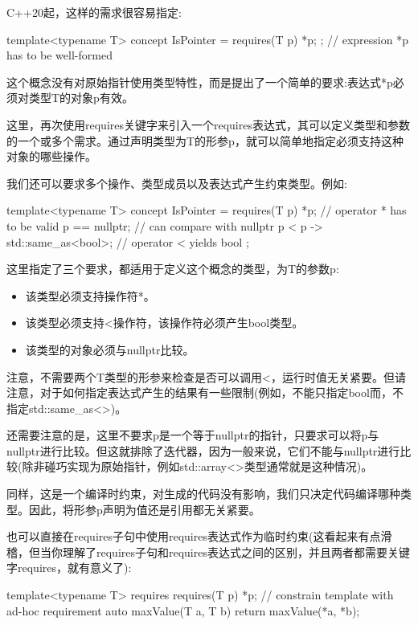 C++20起，这样的需求很容易指定:

\begin{cpp}
template<typename T>
concept IsPointer = requires(T p) { *p; }; // expression *p has to be well-formed
\end{cpp}

这个概念没有对原始指针使用类型特性，而是提出了一个简单的要求:表达式*p必须对类型T的对象p有效。

这里，再次使用requires关键字来引入一个requires表达式，其可以定义类型和参数的一个或多个需求。通过声明类型为T的形参p，就可以简单地指定必须支持这种对象的哪些操作。

我们还可以要求多个操作、类型成员以及表达式产生约束类型。例如:

\begin{cpp}
template<typename T>
concept IsPointer = requires(T p) {
	*p; // operator * has to be valid
	p == nullptr; // can compare with nullptr
	{p < p} -> std::same_as<bool>; // operator < yields bool
};
\end{cpp}

这里指定了三个要求，都适用于定义这个概念的类型，为T的参数p:

\begin{itemize}
\item
该类型必须支持操作符*。

\item
该类型必须支持<操作符，该操作符必须产生bool类型。

\item
该类型的对象必须与nullptr比较。
\end{itemize}

注意，不需要两个T类型的形参来检查是否可以调用<，运行时值无关紧要。但请注意，对于如何指定表达式产生的结果有一些限制(例如，不能只指定bool而，不指定std::same\_as<>)。

还需要注意的是，这里不要求p是一个等于nullptr的指针，只要求可以将p与nullptr进行比较。但这就排除了迭代器，因为一般来说，它们不能与nullptr进行比较(除非碰巧实现为原始指针，例如std::array<>类型通常就是这种情况)。

同样，这是一个编译时约束，对生成的代码没有影响，我们只决定代码编译哪种类型。因此，将形参p声明为值还是引用都无关紧要。

也可以直接在requires子句中使用requires表达式作为临时约束(这看起来有点滑稽，但当你理解了requires子句和requires表达式之间的区别，并且两者都需要关键字requires，就有意义了):

\begin{cpp}
template<typename T>
requires requires(T p) { *p; } // constrain template with ad-hoc requirement
auto maxValue(T a, T b)
{
	return maxValue(*a, *b);
}
\end{cpp}

